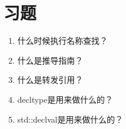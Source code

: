 \section{习题}
\begin{enumerate}
\item
什么时候执行名称查找？

\item
什么是推导指南？

\item
什么是转发引用？

\item
decltype是用来做什么的？

\item
std::declval是用来做什么的？
\end{enumerate}